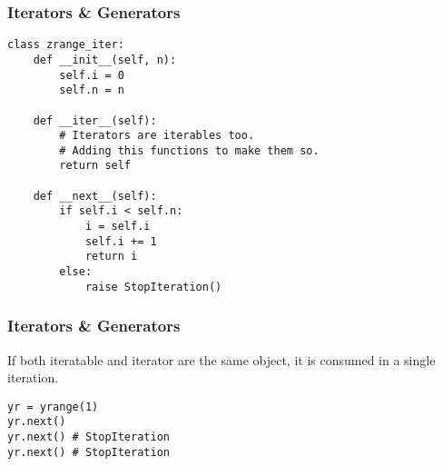\documentclass{../py-lecture}
\begin{document}
\begin{frame}[fragile]
	\frametitle{Iterators \& Generators}
  \begin{verbatim}
class zrange_iter:
    def __init__(self, n):
        self.i = 0
        self.n = n

    def __iter__(self):
        # Iterators are iterables too.
        # Adding this functions to make them so.
        return self

    def __next__(self):
        if self.i < self.n:
            i = self.i
            self.i += 1
            return i
        else:
            raise StopIteration()
	\end{verbatim}
\end{frame}

\begin{frame}
	\frametitle{Iterators \& Generators}
  \begin{block}{}
		If both iteratable and iterator are the same object, it is consumed in a single iteration.
	\end{block}
  \begin{verbatim}
yr = yrange(1)
yr.next()
yr.next() # StopIteration
yr.next() # StopIteration
	\end{verbatim}
\end{frame}
\end{document}
